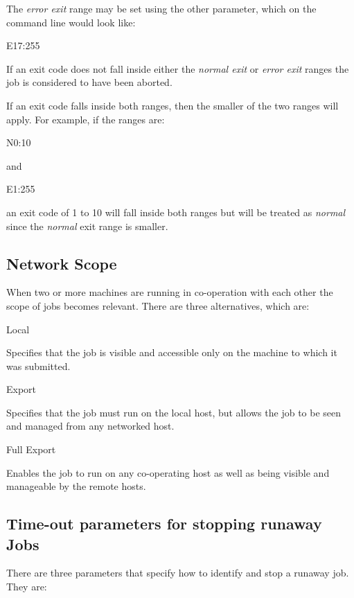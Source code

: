 The \textit{error exit} range may be set using the other parameter, which on the \PrBtr{} command line would look like:

\begin{expara}

E17:255

\end{expara}

If an exit code does not fall inside either the \textit{normal exit} or \textit{error exit} ranges the job is considered to have been aborted.

If an exit code falls inside both ranges, then the smaller of the two ranges will apply. For example, if the ranges are:

\begin{expara}

N0:10

\end{expara}

and

\begin{expara}

E1:255

\end{expara}

an exit code of 1 to 10 will fall inside both ranges but will be treated as \textit{normal} since the \textit{normal} exit range is smaller.

\subsection{Network Scope}
When two or more machines are running \ProductName{} in co-operation with each other the scope of jobs becomes relevant. There are three alternatives,
which are:

Local

Specifies that the job is visible and accessible only on the machine to which it was submitted.

Export

Specifies that the job must run on the local host, but allows the job to be seen and managed from any networked \ProductName{} host.

Full Export

Enables the job to run on any co-operating \ProductName{} host as well as being visible and manageable by the remote hosts.

\subsection{Time-out parameters for stopping runaway Jobs}
There are three parameters that specify how to identify and stop a runaway job. They are:

